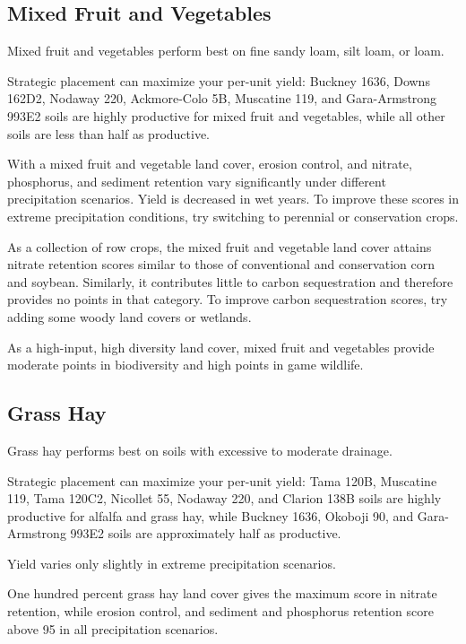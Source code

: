 \documentclass[11pt]{article}
\begin{document}
\subsection{Mixed Fruit and Vegetables}

Mixed fruit and vegetables perform best on fine sandy loam, silt loam, or loam. 

Strategic placement can maximize your per-unit yield: Buckney 1636, Downs 162D2, Nodaway 220, Ackmore-Colo 5B, Muscatine 119, and Gara-Armstrong 993E2 soils are highly productive for mixed fruit and vegetables, while all other soils are less than half as productive.

With a mixed fruit and vegetable land cover, erosion control, and nitrate, phosphorus, and sediment retention vary significantly under different precipitation scenarios. Yield is decreased in wet years. To improve these scores in extreme precipitation conditions, try switching to perennial or conservation crops.

As a collection of row crops, the mixed fruit and vegetable land cover attains nitrate retention scores similar to those of conventional and conservation corn and soybean. Similarly, it contributes little to carbon sequestration and therefore provides no points in that category. To improve carbon sequestration scores, try adding some woody land covers or wetlands.

As a high-input, high diversity land cover, mixed fruit and vegetables provide moderate points in biodiversity and high points in game wildlife.

\subsection{Grass Hay}

Grass hay performs best on soils with excessive to moderate drainage.

Strategic placement can maximize your per-unit yield: Tama 120B, Muscatine 119, Tama 120C2, Nicollet 55, Nodaway 220, and Clarion 138B soils are highly productive for alfalfa and grass hay, while Buckney 1636, Okoboji 90, and Gara-Armstrong 993E2 soils are approximately half as productive.

Yield varies only slightly in extreme precipitation scenarios.

One hundred percent grass hay land cover gives the maximum score in nitrate retention, while erosion control, and sediment and phosphorus retention score above 95 in all precipitation scenarios.
\end{document}
